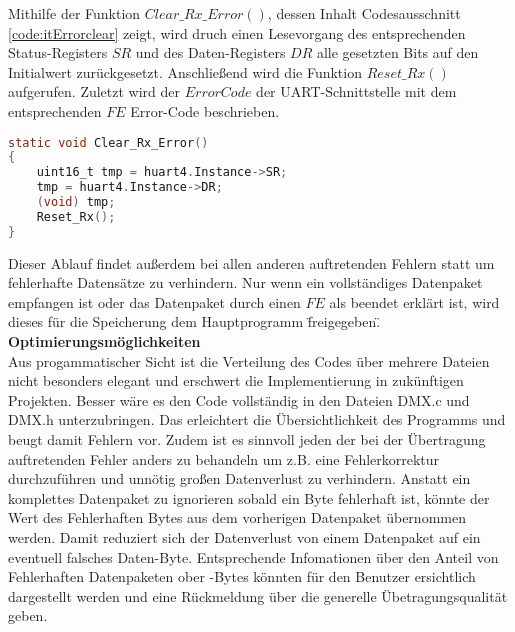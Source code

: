 Mithilfe der Funktion $Clear\_Rx\_Error()$, dessen Inhalt Codesausschnitt \ref{code:itErrorclear} zeigt, wird druch einen Lesevorgang des entsprechenden Status-Registers $SR$ und des Daten-Registers $DR$ alle gesetzten Bits auf den Initialwert zurückgesetzt. Anschließend wird die Funktion $Reset\_Rx()$ aufgerufen. Zuletzt wird der $ErrorCode$ der UART-Schnittstelle mit dem entsprechenden $FE$ Error-Code beschrieben. 
\begin{lstlisting}[caption = stm32f4xx\_it.c: UART Clear\_Rx\_Error(),
	label = code:itErrorclear, 
	language = C, 
	firstnumber = 426]
static void Clear_Rx_Error()
{
	uint16_t tmp = huart4.Instance->SR;
	tmp = huart4.Instance->DR;
	(void) tmp;
	Reset_Rx();
}
\end{lstlisting}
Dieser Ablauf findet außerdem bei allen anderen auftretenden Fehlern statt um fehlerhafte Datensätze zu verhindern. Nur wenn ein vollständiges Datenpaket empfangen ist oder das Datenpaket durch einen $FE$ als beendet erklärt ist, wird dieses für die Speicherung dem Hauptprogramm \"freigegeben\".\\
\newline
\textbf{Optimierungsmöglichkeiten}\\
Aus progammatischer Sicht ist die Verteilung des Codes über mehrere Dateien nicht besonders elegant und erschwert die Implementierung in zukünftigen Projekten. Besser wäre es den Code vollständig in den Dateien DMX.c und DMX.h unterzubringen. Das erleichtert die Übersichtlichkeit des Programms und beugt damit Fehlern vor. Zudem ist es sinnvoll jeden der bei der Übertragung auftretenden Fehler anders zu behandeln um z.B. eine Fehlerkorrektur durchzuführen und unnötig großen Datenverlust zu verhindern. Anstatt ein komplettes Datenpaket zu ignorieren sobald ein Byte fehlerhaft ist, könnte der Wert des Fehlerhaften Bytes aus dem vorherigen Datenpaket übernommen werden. Damit reduziert sich der Datenverlust von einem Datenpaket auf ein eventuell falsches Daten-Byte. Entsprechende Infomationen über den Anteil von Fehlerhaften Datenpaketen ober -Bytes könnten für den Benutzer ersichtlich dargestellt werden und eine Rückmeldung über die generelle Übetragungsqualität geben.